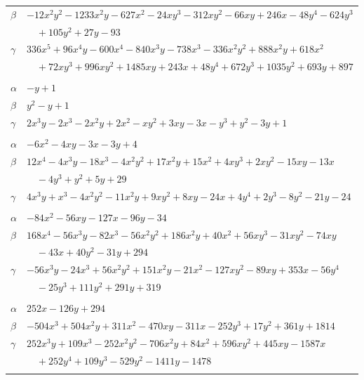 \documentclass[11pt]{article}
\begin{document}
\begin{longtable}{@{}ll@{}}
$\beta$ & $-12x^{2}y^{2}-1233x^{2}y-627x^{2}-24xy^{3}-312xy^{2}-66xy+246x-48y^{4}-624y^{3}$\\
 & $\quad +105y^{2}+27y-93$\\
$\gamma$ & $336x^{5}+96x^{4}y-600x^{4}-840x^{3}y-738x^{3}-336x^{2}y^{2}+888x^{2}y+618x^{2}$\\
 & $\quad +72xy^{3}+996xy^{2}+1485xy+243x+48y^{4}+672y^{3}+1035y^{2}+693y+897$\\
\addlinespace[3pt]
\multicolumn{2}{@{}l}{$\{i,j\}=\{4,55\}$, $k_{ij}=1$}\\
$\alpha$ & $-y+1$\\
$\beta$ & $y^{2}-y+1$\\
$\gamma$ & $2x^{3}y-2x^{3}-2x^{2}y+2x^{2}-xy^{2}+3xy-3x-y^{3}+y^{2}-3y+1$\\
\addlinespace[3pt]
\multicolumn{2}{@{}l}{$\{i,j\}=\{4,56\}$, $k_{ij}=1$}\\
$\alpha$ & $-6x^{2}-4xy-3x-3y+4$\\
$\beta$ & $12x^{4}-4x^{3}y-18x^{3}-4x^{2}y^{2}+17x^{2}y+15x^{2}+4xy^{3}+2xy^{2}-15xy-13x$\\
 & $\quad -4y^{3}+y^{2}+5y+29$\\
$\gamma$ & $4x^{3}y+x^{3}-4x^{2}y^{2}-11x^{2}y+9xy^{2}+8xy-24x+4y^{4}+2y^{3}-8y^{2}-21y-24$\\
\addlinespace[3pt]
\multicolumn{2}{@{}l}{$\{i,j\}=\{4,60\}$, $k_{ij}=3^{2}$}\\
$\alpha$ & $-84x^{2}-56xy-127x-96y-34$\\
$\beta$ & $168x^{4}-56x^{3}y-82x^{3}-56x^{2}y^{2}+186x^{2}y+40x^{2}+56xy^{3}-31xy^{2}-74xy$\\
 & $\quad -43x+40y^{2}-31y+294$\\
$\gamma$ & $-56x^{3}y-24x^{3}+56x^{2}y^{2}+151x^{2}y-21x^{2}-127xy^{2}-89xy+353x-56y^{4}$\\
 & $\quad -25y^{3}+111y^{2}+291y+319$\\
\addlinespace[3pt]
\multicolumn{2}{@{}l}{$\{i,j\}=\{4,66\}$, $k_{ij}=2\cdot 3\cdot 7$}\\
$\alpha$ & $252x-126y+294$\\
$\beta$ & $-504x^{3}+504x^{2}y+311x^{2}-470xy-311x-252y^{3}+17y^{2}+361y+1814$\\
$\gamma$ & $252x^{3}y+109x^{3}-252x^{2}y^{2}-706x^{2}y+84x^{2}+596xy^{2}+445xy-1587x$\\
 & $\quad +252y^{4}+109y^{3}-529y^{2}-1411y-1478$\\
\addlinespace[3pt]
\multicolumn{2}{@{}l}{$\{i,j\}=\{4,67\}$, $k_{ij}=2^{2}\cdot 3^{2}$}\\

\end{longtable}
\end{document}
